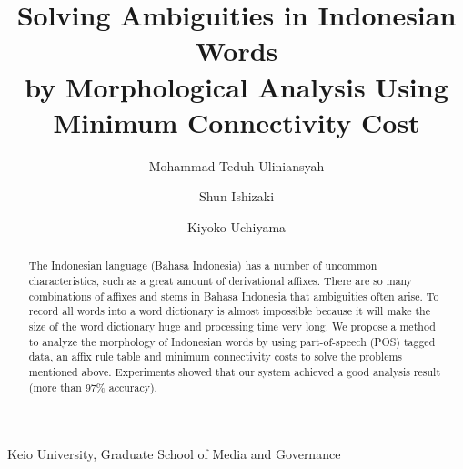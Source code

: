 \documentclass[english]{nlp}
\begin{document}
\setcounter{page}{1}
\setcounter{Volume}{2}
\setcounter{Number}{3}
\setcounter{Year}{1995}
\setcounter{Month}{7}

\title{
Solving Ambiguities in Indonesian Words\\
by Morphological Analysis Using\\
Minimum Connectivity Cost
}

\author{Mohammad Teduh Uliniansyah   \and
        Shun Ishizaki        \and
        Kiyoko Uchiyama}


          {Keio University, Graduate School of Media and Governance}

\begin{abstract}
The Indonesian language (Bahasa Indonesia) has a number of uncommon 
characteristics, such as a great amount of derivational affixes. 
There are so many combinations of affixes and stems in Bahasa Indonesia
that ambiguities often arise.
To record all words into a word dictionary is almost impossible 
because it will make the size of the word dictionary 
huge and processing time very long.
We propose a method to analyze the morphology of Indonesian words by
using part-of-speech (POS) tagged data, an affix rule table and
minimum connectivity costs to solve the problems mentioned above.
Experiments showed that our system achieved a good analysis result
(more than 97\% accuracy).
\end{abstract}


\maketitle
\end{document}
